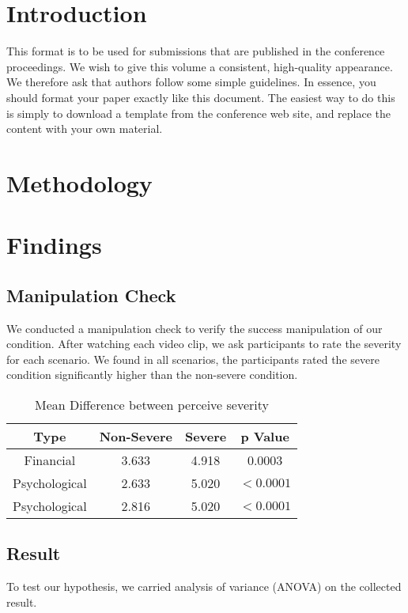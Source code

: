 \documentclass{sigchi}
\begin{document}
\section{Introduction}

This format is to be used for submissions that are
published in the conference proceedings.  We wish to give
this volume a consistent, high-quality appearance. We
therefore ask that authors follow some simple\cite{Mather2000}
guidelines. In essence, you should format your paper
exactly like this document. The easiest way to do this is
simply to download a template from the conference web
site, and replace the content with your own material.

\section{Methodology}
\section{Findings}

\subsection{Manipulation Check}
We conducted a manipulation check to verify the success manipulation of our condition. After watching each video clip, we ask participants to rate the severity for each scenario. We found in all scenarios, the participants rated the severe condition significantly higher than the non-severe condition.

\begin{table}
  \centering
  \begin{tabular}{|c|c|c|c|}
    \hline
    Type & Non-Severe & Severe & p Value \\
    \hline
    Financial & 3.633 & 4.918 & 0.0003 \\
    \hline
    Psychological & 2.633 & 5.020 & $ < 0.0001$ \\
    \hline
    Psychological & 2.816 & 5.020 & $ < 0.0001$ \\
    \hline
  \end{tabular}
  \caption{Mean Difference between perceive severity}
  \label{tab:table1}
\end{table}

\subsection{Result}
To test our hypothesis, we carried analysis of variance (ANOVA) on the collected result. 
\end{document}
